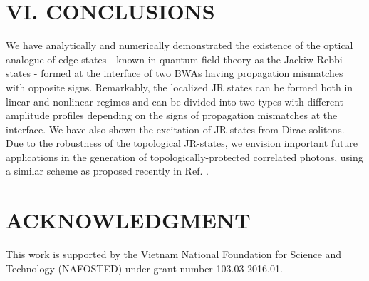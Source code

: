 \documentclass[twocolumn,aps, prl,showpacs]{revtex4}
\begin{document}
\section{VI. CONCLUSIONS}
\label{conclusion}

We have analytically and numerically demonstrated the existence of the optical analogue of edge states - known in quantum field theory as the Jackiw-Rebbi states - formed at the interface of two BWAs having propagation mismatches with opposite signs. Remarkably, the localized JR states can be formed both in linear and nonlinear regimes and can be divided into two types with different amplitude profiles depending on the signs of propagation mismatches at the interface. We have also shown the excitation of JR-states from Dirac solitons. Due to the robustness of the topological JR-states, we envision important future applications in
the generation of topologically-protected correlated photons, using a similar scheme as proposed recently in Ref. \cite{blanco}.

\section{ACKNOWLEDGMENT}
This work is supported by the Vietnam National Foundation for Science and Technology (NAFOSTED) under grant number 103.03-2016.01.
\end{document}
